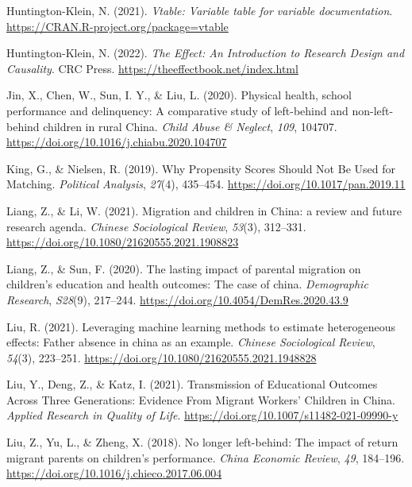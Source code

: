 \documentclass[
  man,floatsintext]{apa7}
\newlength{\cslhangindent}
\newlength{\cslentryspacingunit} %
\newenvironment{CSLReferences}[2] %
 {%
  \setlength{\parindent}{0pt}
  \ifodd #1
  \let\oldpar\par
  \def\par{\hangindent=\cslhangindent\oldpar}
  \fi
  \setlength{\parskip}{#2\cslentryspacingunit}
 }%
 {}
\begin{document}
\begin{CSLReferences}{1}{0}
\leavevmode{}%
Huntington-Klein, N. (2021). \emph{Vtable: Variable table for variable documentation}. \url{https://CRAN.R-project.org/package=vtable}

\leavevmode{}%
Huntington-Klein, N. (2022). \emph{The Effect: An Introduction to Research Design and Causality}. CRC Press. \url{https://theeffectbook.net/index.html}

\leavevmode{}%
Jin, X., Chen, W., Sun, I. Y., \& Liu, L. (2020). Physical health, school performance and delinquency: A comparative study of left-behind and non-left-behind children in rural China. \emph{Child Abuse \& Neglect}, \emph{109}, 104707. \url{https://doi.org/10.1016/j.chiabu.2020.104707}

\leavevmode{}%
King, G., \& Nielsen, R. (2019). Why Propensity Scores Should Not Be Used for Matching. \emph{Political Analysis}, \emph{27}(4), 435--454. \url{https://doi.org/10.1017/pan.2019.11}

\leavevmode{}%
Liang, Z., \& Li, W. (2021). Migration and children in China: a review and future research agenda. \emph{Chinese Sociological Review}, \emph{53}(3), 312--331. \url{https://doi.org/10.1080/21620555.2021.1908823}

\leavevmode{}%
Liang, Z., \& Sun, F. (2020). The lasting impact of parental migration on children's education and health outcomes: The case of china. \emph{Demographic Research}, \emph{S28}(9), 217--244. \url{https://doi.org/10.4054/DemRes.2020.43.9}

\leavevmode{}%
Liu, R. (2021). Leveraging machine learning methods to estimate heterogeneous effects: Father absence in china as an example. \emph{Chinese Sociological Review}, \emph{54}(3), 223--251. \url{https://doi.org/10.1080/21620555.2021.1948828}

\leavevmode{}%
Liu, Y., Deng, Z., \& Katz, I. (2021). Transmission of Educational Outcomes Across Three Generations: Evidence From Migrant Workers{'} Children in China. \emph{Applied Research in Quality of Life}. \url{https://doi.org/10.1007/s11482-021-09990-y}

\leavevmode{}%
Liu, Z., Yu, L., \& Zheng, X. (2018). No longer left-behind: The impact of return migrant parents on children's performance. \emph{China Economic Review}, \emph{49}, 184--196. \url{https://doi.org/10.1016/j.chieco.2017.06.004}


\end{CSLReferences}
\end{document}
